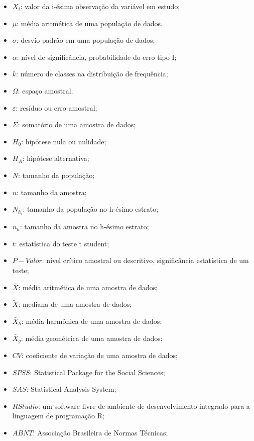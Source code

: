 \begin{refsection}

\begin{itemize}
\item $X_{i}$: valor da i-ésima observação da variável em estudo;
\item $\mu$: média aritmética de uma população de dados.
\item $\sigma$: desvio-padrão em uma população de dados;
\item $\alpha$: nível de significância, probabilidade do erro tipo I;
\item $k$: número de classes na distribuição de frequência;
\item $\Omega$: espaço amostral;
\item $\varepsilon$: resíduo ou erro amostral;
\item $\Sigma$: somatório de uma amostra de dados;
\item $H_{0}$: hipótese nula ou nulidade;
\item $H_{A}$: hipótese alternativa;
\item $N$: tamanho da população; 
\item $n$: tamanho da amostra;
\item $N_{h_{i}}$: tamanho da população no h-ésimo estrato;
\item $n_{h}$: tamanho da amostra no h-ésimo estrato;
\item $t$: estatística do teste t student;
\item $P-Valor$: nível crítico amostral ou descritivo, significância estatística de um teste;
\item $\bar{X}$: média aritmética de uma amostra de dados;
\item $\widetilde{X}$: mediana de uma amostra de dados; 
\item $\bar{X}_{h}$: média harmônica de uma amostra de dados;  
\item $\bar{X}_{g}$: média geométrica de uma amostra de dados;
\item $CV$: coeficiente de variação de uma amostra de dados;
\item $SPSS$: Statistical Package for the Social Sciences;
\item $SAS$: Statistical Analysis System;
\item $RStudio$: um software livre de ambiente de desenvolvimento integrado para a linguagem de programação R;
\item $ABNT$: Associação Brasileira de Normas Técnicas;

\end{itemize}
\end{refsection}
